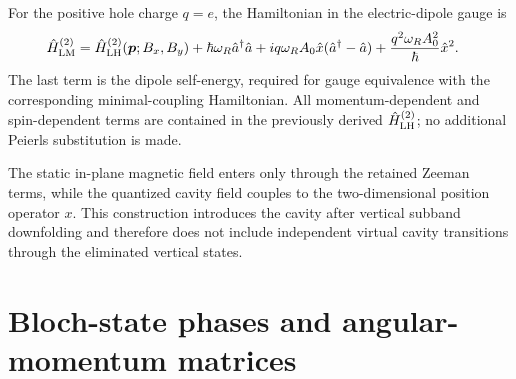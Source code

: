 For the positive hole charge $q=e$, the Hamiltonian
in the electric-dipole gauge is
\begin{align}
\hat H_{\mathrm{LM}}^{(2)}
={}&\hat H_{\mathrm{LH}}^{(2)}(\bm p;B_x,B_y)
+\hbar\omega_R\hat a^\dagger\hat a+iq\omega_R A_0\hat x(\hat a^\dagger - \hat a)
+\frac{q^2\omega_R A_0^2}{\hbar}\hat x^2.
\label{eq:LH-cavity-dipole}
\end{align}
The last term is the dipole self-energy, required
for gauge equivalence with the corresponding
minimal-coupling Hamiltonian. All momentum-dependent
and spin-dependent terms are contained in the
previously derived $\hat H_{\mathrm{LH}}^{(2)}$; no additional
Peierls substitution is made.

The static in-plane magnetic field enters only through
the retained Zeeman terms, while the quantized cavity
field couples to the two-dimensional position operator
$x$. This construction introduces the cavity after
vertical subband downfolding and therefore does not
include independent virtual cavity transitions through
the eliminated vertical states.















\newpage
\appendix
\renewcommand{\thesection}{\Alph{section}}
\titleformat{\section}{\centering\normalfont\small\bfseries}{APPENDIX \thesection:}{0.6em}{\MakeUppercase}

\section{Bloch-state phases and angular-momentum matrices}
\label{app:phases}

